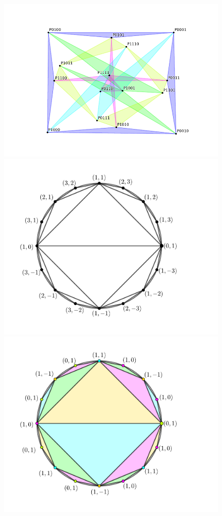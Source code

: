 \documentclass[11pt,reqno]{amsart}
\theoremstyle{remark}
\begin{document}
\begin{figure}[H]
\includegraphics[scale=.6]{A22.pdf}
\includegraphics[scale=.195]{perf.pdf}
\includegraphics[scale=.195]{perf_3.pdf}

\end{figure}
\end{document}
